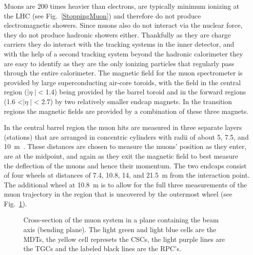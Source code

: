 Muons are 200 times heavier than electrons, are typically minimum ionizing at the LHC (see Fig.~\ref{StoppingMuon}) and therefore do not produce electromagnetic showers.  
Since muons also do not interact via the nuclear force, they do not produce hadronic showers either.  
Thankfully as they are charge carriers they do interact with the tracking systems in the inner detector, and with the help of a second tracking system beyond the hadronic calorimeter they are easy to identify as they are the only ionizing particles that regularly pass through the entire calorimeter.  
The magnetic field for the muon spectrometer is provided by large superconducting air-core toroids, with the field in the central region ($\mid\eta\mid$< 1.4) being provided by the barrel toroid and in the forward regions (1.6 <$\mid\eta\mid$< 2.7) by two relatively smaller endcap magnets.  
In the transition regions the magnetic fields are provided by a combination of these three magnets.  

In the central barrel region the muon hits are measured in three separate layers (stations) that are arranged in concentric cylinders with radii of about 5, 7.5, and 10~m~\cite{MuonTDR}.  
These distances are chosen to measure the muons' position as they enter, are at the midpoint, and again as they exit the magnetic field to best measure the deflection of the muons and hence their momentum.  
The two endcaps consist of four wheels at distances of 7.4, 10.8, 14, and 21.5~m from the interaction point. 
The additional wheel at 10.8~m is to allow for the full three measurements of the muon trajectory in the region that is uncovered by the outermost wheel (see Fig.~\ref{MuonSpectroFig}).


\begin{figure}[!ht]
  \begin{center}
  \end{center}
  \caption[Muon system cross section.]
      {\small Cross-section of the muon system in a plane containing the beam axis (bending plane).  The light green and light blue cells are the MDTs, the yellow cell represets the CSCs, the light purple lines are the TGCs and the labeled black lines are the RPC's.  }
  \label{MuonSpectroFig}
\end{figure}

